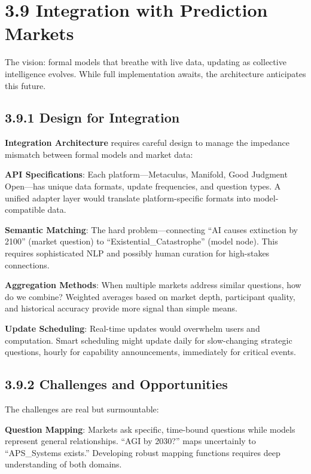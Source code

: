 \documentclass[
  11pt,
  letterpaper,
]{book}
\begin{document}
\section{3.9 Integration with Prediction
Markets}\label{sec-market-integration}

The vision: formal models that breathe with live data, updating as
collective intelligence evolves. While full implementation awaits, the
architecture anticipates this future.

\subsection{3.9.1 Design for Integration}\label{sec-integration-design}

\textbf{Integration Architecture} requires careful design to manage the
impedance mismatch between formal models and market data:

\textbf{API Specifications}: Each platform---Metaculus, Manifold, Good
Judgment Open---has unique data formats, update frequencies, and
question types. A unified adapter layer would translate
platform-specific formats into model-compatible data.

\textbf{Semantic Matching}: The hard problem---connecting ``AI causes
extinction by 2100'' (market question) to ``Existential\_Catastrophe''
(model node). This requires sophisticated NLP and possibly human
curation for high-stakes connections.

\textbf{Aggregation Methods}: When multiple markets address similar
questions, how do we combine? Weighted averages based on market depth,
participant quality, and historical accuracy provide more signal than
simple means.

\textbf{Update Scheduling}: Real-time updates would overwhelm users and
computation. Smart scheduling might update daily for slow-changing
strategic questions, hourly for capability announcements, immediately
for critical events.

\subsection{3.9.2 Challenges and
Opportunities}\label{sec-market-challenges}

The challenges are real but surmountable:

\textbf{Question Mapping}: Markets ask specific, time-bound questions
while models represent general relationships. ``AGI by 2030?'' maps
uncertainly to ``APS\_Systems exists.'' Developing robust mapping
functions requires deep understanding of both domains.
\end{document}
